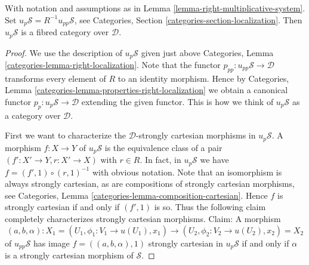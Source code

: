 \begin{lemma}
\label{lemma-fibred-category-pullback}
With notation and assumptions as in
Lemma \ref{lemma-right-multiplicative-system}.
Set $u_p\mathcal{S} = R^{-1}u_{pp}\mathcal{S}$, see
Categories, Section \ref{categories-section-localization}.
Then $u_p\mathcal{S}$ is a fibred category over $\mathcal{D}$.
\end{lemma}

\begin{proof}
We use the description of $u_p\mathcal{S}$ given just above
Categories, Lemma \ref{categories-lemma-right-localization}.
Note that the functor $p_{pp} : u_{pp}\mathcal{S} \to \mathcal{D}$
transforms every element of $R$ to an identity morphism.
Hence by
Categories, Lemma \ref{categories-lemma-properties-right-localization}
we obtain a canonical functor $p_p : u_p\mathcal{S} \to \mathcal{D}$
extending the given functor. This is how we think of
$u_p\mathcal{S}$ as a category over $\mathcal{D}$.

\medskip\noindent
First we want to characterize the $\mathcal{D}$-strongly cartesian morphisms
in $u_p\mathcal{S}$.
A morphism $f : X \to Y$ of $u_p\mathcal{S}$ is the equivalence class of
a pair $(f' : X' \to Y, r : X' \to X)$ with $r \in R$.
In fact, in $u_p\mathcal{S}$ we have $f = (f', 1) \circ (r, 1)^{-1}$
with obvious notation.
Note that an isomorphism is always strongly cartesian, as are
compositions of strongly cartesian morphisms, see
Categories, Lemma \ref{categories-lemma-composition-cartesian}.
Hence $f$ is strongly cartesian if and only if $(f', 1)$ is so.
Thus the following claim completely characterizes strongly cartesian
morphisms. Claim: A morphism
$$
(a, b, \alpha) :
X_1 = (U_1, \phi_1 : V_1 \to u(U_1), x_1)
\longrightarrow
(U_2, \phi_2 : V_2 \to u(U_2), x_2) = X_2
$$
of $u_{pp}\mathcal{S}$ has image $f = ((a, b, \alpha), 1)$
strongly cartesian in $u_p\mathcal{S}$ if and only if $\alpha$
is a strongly cartesian morphism of $\mathcal{S}$.


\end{proof}
